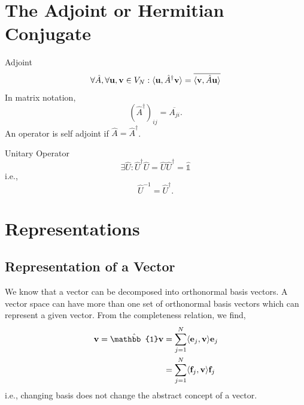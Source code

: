 \documentclass{book}
\def\innerproduct#1#2{\langle#1,#2\rangle}
\begin{document}
\section{The Adjoint or Hermitian Conjugate}
\begin{Definitions}{Adjoint}{}
	\begin{equation}
	\forall \hat{A}, \forall \vb{u},\vb{v} \in V_N : \innerproduct{\vb{u}}{\hat{A}^{\dag}\vb{v}} = \overline{\innerproduct{\vb{v}}{\hat{A}\vb{u}}}
\end{equation}
In matrix notation,
\begin{equation}
	(\hat{A}^{\dag})_{ij} = \overline{A_{ji}}.
\end{equation}
An operator is self adjoint if $\hat{A} = \hat{A}^{\dag}$.
\end{Definitions}
\begin{Definitions}{Unitary Operator}{}
	\begin{equation}
		\exists \hat{U} : \hat{U}^{\dag}\hat{U} = \hat{U}\hat{U}^{\dag} = \hat{\mathbb{1}}
	\end{equation}
	i.e.,
	\begin{equation}
		\hat{U}^{-1} = \hat{U}^{\dag}.
	\end{equation}
\end{Definitions}

\section{Representations}
\subsection{Representation of a Vector}
We know that a vector can be decomposed into orthonormal basis vectors. A vector space can have more than one set of orthonormal basis vectors which can represent a given vector. From the completeness relation, we find,
\begin{equation}
	\begin{split}
		\vb{v} = \hat{\mathbb{1}}\vb{v} &= \sum_{j=1}^N \innerproduct{\vb{e}_j}{\vb{v}}\vb{e}_j \\ 
		& = \sum_{j=1}^N\innerproduct{\vb{f}_j}{\vb{v}}\vb{f}_j
	\end{split}
\end{equation}
i.e., changing basis does not change the abstract concept of a vector.
\end{document}
